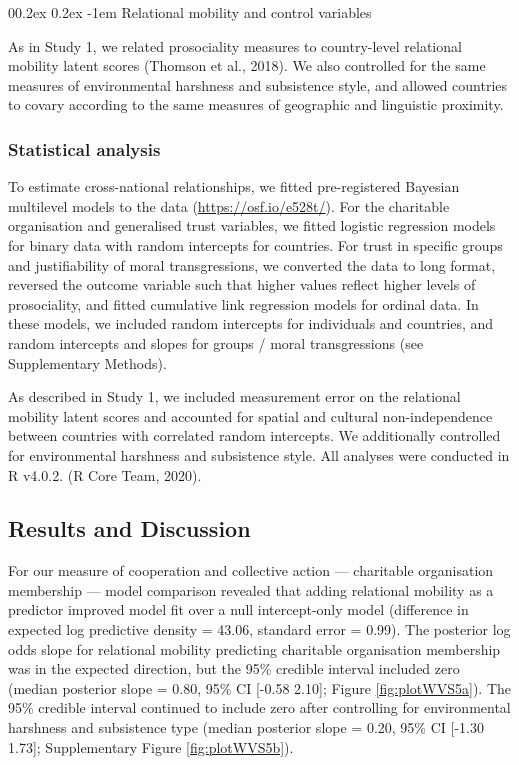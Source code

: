 \documentclass[english,man,floatsintext]{apa6}
\makeatletter
\renewcommand{\paragraph}{\@startsection{paragraph}{4}{\parindent}%
  {0\baselineskip \@plus 0.2ex \@minus 0.2ex}%
  {-1em}%
  {\normalfont\normalsize\bfseries\itshape\typesectitle}}
\makeatother
\begin{document}
\hypertarget{relational-mobility-and-control-variables}{%
\paragraph{Relational mobility and control variables}\label{relational-mobility-and-control-variables}}

As in Study 1, we related prosociality measures to country-level relational mobility latent scores (Thomson et al., 2018). We also controlled for the same measures of environmental harshness and subsistence style, and allowed countries to covary according to the same measures of geographic and linguistic proximity.

\hypertarget{statistical-analysis-1}{%
\subsubsection{Statistical analysis}\label{statistical-analysis-1}}

To estimate cross-national relationships, we fitted pre-registered Bayesian multilevel models to the data (\url{https://osf.io/e528t/}). For the charitable organisation and generalised trust variables, we fitted logistic regression models for binary data with random intercepts for countries. For trust in specific groups and justifiability of moral transgressions, we converted the data to long format, reversed the outcome variable such that higher values reflect higher levels of prosociality, and fitted cumulative link regression models for ordinal data. In these models, we included random intercepts for individuals and countries, and random intercepts and slopes for groups / moral transgressions (see Supplementary Methods).

As described in Study 1, we included measurement error on the relational mobility latent scores and accounted for spatial and cultural non-independence between countries with correlated random intercepts. We additionally controlled for environmental harshness and subsistence style. All analyses were conducted in R v4.0.2. (R Core Team, 2020).

\hypertarget{results-and-discussion-1}{%
\subsection{Results and Discussion}\label{results-and-discussion-1}}

For our measure of cooperation and collective action --- charitable organisation membership --- model comparison revealed that adding relational mobility as a predictor improved model fit over a null intercept-only model (difference in expected log predictive density = 43.06, standard error = 0.99). The posterior log odds slope for relational mobility predicting charitable organisation membership was in the expected direction, but the 95\% credible interval included zero (median posterior slope = 0.80, 95\% CI {[}-0.58 2.10{]}; Figure \ref{fig:plotWVS5a}). The 95\% credible interval continued to include zero after controlling for environmental harshness and subsistence type (median posterior slope = 0.20, 95\% CI {[}-1.30 1.73{]}; Supplementary Figure \ref{fig:plotWVS5b}).
\end{document}
